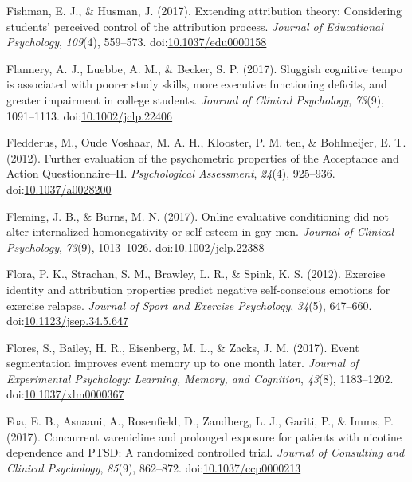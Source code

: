 \documentclass[english,man]{apa6}
\theoremstyle{definition}
\theoremstyle{definition}
\theoremstyle{definition}
\theoremstyle{remark}
\begin{document}
\hypertarget{ref-Fishman2017}{}
Fishman, E. J., \& Husman, J. (2017). Extending attribution theory:
Considering students' perceived control of the attribution process.
\emph{Journal of Educational Psychology}, \emph{109}(4), 559--573.
doi:\href{https://doi.org/10.1037/edu0000158}{10.1037/edu0000158}

\hypertarget{ref-Flannery2017}{}
Flannery, A. J., Luebbe, A. M., \& Becker, S. P. (2017). Sluggish
cognitive tempo is associated with poorer study skills, more executive
functioning deficits, and greater impairment in college students.
\emph{Journal of Clinical Psychology}, \emph{73}(9), 1091--1113.
doi:\href{https://doi.org/10.1002/jclp.22406}{10.1002/jclp.22406}

\hypertarget{ref-Fledderus2012}{}
Fledderus, M., Oude Voshaar, M. A. H., Klooster, P. M. ten, \&
Bohlmeijer, E. T. (2012). Further evaluation of the psychometric
properties of the Acceptance and Action Questionnaire--II.
\emph{Psychological Assessment}, \emph{24}(4), 925--936.
doi:\href{https://doi.org/10.1037/a0028200}{10.1037/a0028200}

\hypertarget{ref-Fleming2017}{}
Fleming, J. B., \& Burns, M. N. (2017). Online evaluative conditioning
did not alter internalized homonegativity or self-esteem in gay men.
\emph{Journal of Clinical Psychology}, \emph{73}(9), 1013--1026.
doi:\href{https://doi.org/10.1002/jclp.22388}{10.1002/jclp.22388}

\hypertarget{ref-Flora2012}{}
Flora, P. K., Strachan, S. M., Brawley, L. R., \& Spink, K. S. (2012).
Exercise identity and attribution properties predict negative
self-conscious emotions for exercise relapse. \emph{Journal of Sport and
Exercise Psychology}, \emph{34}(5), 647--660.
doi:\href{https://doi.org/10.1123/jsep.34.5.647}{10.1123/jsep.34.5.647}

\hypertarget{ref-Flores2017}{}
Flores, S., Bailey, H. R., Eisenberg, M. L., \& Zacks, J. M. (2017).
Event segmentation improves event memory up to one month later.
\emph{Journal of Experimental Psychology: Learning, Memory, and
Cognition}, \emph{43}(8), 1183--1202.
doi:\href{https://doi.org/10.1037/xlm0000367}{10.1037/xlm0000367}

\hypertarget{ref-Foa2017a}{}
Foa, E. B., Asnaani, A., Rosenfield, D., Zandberg, L. J., Gariti, P., \&
Imms, P. (2017). Concurrent varenicline and prolonged exposure for
patients with nicotine dependence and PTSD: A randomized controlled
trial. \emph{Journal of Consulting and Clinical Psychology},
\emph{85}(9), 862--872.
doi:\href{https://doi.org/10.1037/ccp0000213}{10.1037/ccp0000213}
\end{document}
